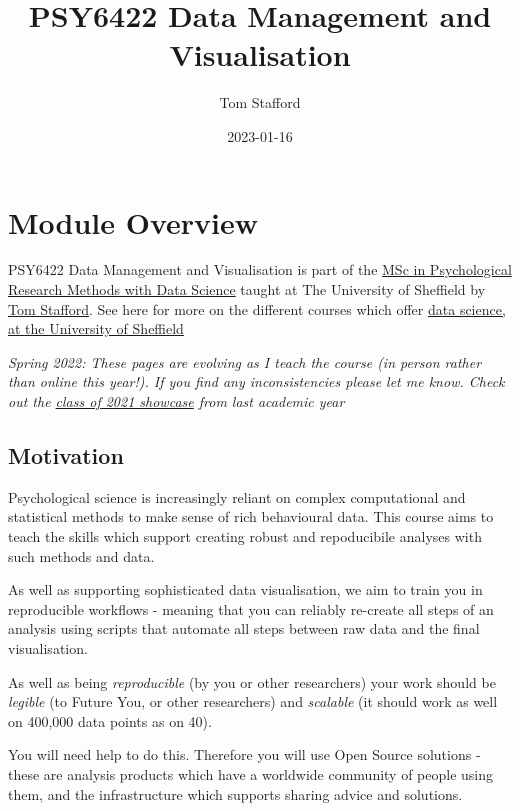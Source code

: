 \documentclass[
]{book}
\title{PSY6422 Data Management and Visualisation}
\author{Tom Stafford}
\date{2023-01-16}
\begin{document}
\maketitle

{
\setcounter{tocdepth}{2}
\tableofcontents
}
\hypertarget{module-overview}{%
\chapter*{Module Overview}\label{module-overview}}


PSY6422 Data Management and Visualisation is part of the \href{https://www.sheffield.ac.uk/psychology/prospectivepg/masters/data-science}{MSc in Psychological Research Methods with Data Science} taught at The University of Sheffield by \href{http://tomstafford.staff.shef.ac.uk/}{Tom Stafford}. See here for more on the different courses which offer \href{notes.html\#data-science-sheffield}{data science, at the University of Sheffield}

\emph{Spring 2022: These pages are evolving as I teach the course (in person rather than online this year!). If you find any inconsistencies please let me know. Check out the \href{class-of-2021.html}{class of 2021 showcase} from last academic year}

\hypertarget{motivation}{%
\section{Motivation}\label{motivation}}

Psychological science is increasingly reliant on complex computational and statistical methods to make sense of rich behavioural data. This course aims to teach the skills which support creating robust and repoducibile analyses with such methods and data.

As well as supporting sophisticated data visualisation, we aim to train you in reproducible workflows - meaning that you can reliably re-create all steps of an analysis using scripts that automate all steps between raw data and the final visualisation.

As well as being \emph{reproducible} (by you or other researchers) your work should be \emph{legible} (to Future You, or other researchers) and \emph{scalable} (it should work as well on 400,000 data points as on 40).

You will need help to do this. Therefore you will use Open Source solutions - these are analysis products which have a worldwide community of people using them, and the infrastructure which supports sharing advice and solutions.
\end{document}
